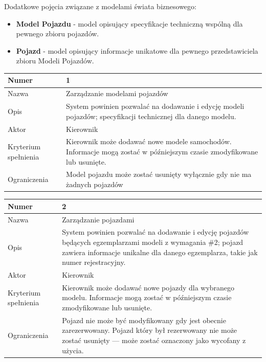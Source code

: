 \documentclass[eng,printmode,openany]{mgr}
\begin{document}
	Dodatkowe pojęcia związane z modelami świata biznesowego:
	\begin{itemize}
		\item \textbf{Model Pojazdu} - model opisujący specyfikacje techniczną wspólną dla pewnego zbioru pojazdów.
		\item \textbf{Pojazd} - model opisujący informacje unikatowe dla pewnego przedstawiciela zbioru Modeli Pojazdów.
	\end{itemize}
	
	\begin{table}[H]
		\begin{tabularx}{\textwidth}{|l|X|}
			\hline
			Numer                & 1  \\ \hline
			Nazwa                & Zarządzanie modelami pojazdów \\ \hline
			Opis                 & System powinien pozwalać na dodawanie i edycję modeli pojazdów; specyfikacji technicznej dla danego modelu.    \\ \hline
			Aktor                & Kierownik \\ \hline
			Kryterium spełnienia & Kierownik może dodawać nowe modele samochodów. Informacje mogą zostać w późniejszym czasie zmodyfikowane lub usunięte.\\ \hline
			Ograniczenia         & Model pojazdu może zostać usunięty wyłącznie gdy nie ma żadnych pojazdów \\ \hline
		\end{tabularx}
	\end{table}
	
	\begin{table}[H]
		\begin{tabularx}{\textwidth}{|l|X|}
			\hline
			Numer                & 2 \\ \hline
			Nazwa                & Zarządzanie pojazdami \\ \hline
			Opis                 & System powinien pozwalać na dodawanie i edycję pojazdów będących egzemplarzami modeli z wymagania \#2; pojazd zawiera informacje unikalne dla danego egzemplarza, takie jak numer rejestracyjny.     \\ \hline
			Aktor                & Kierownik \\ \hline
			Kryterium spełnienia & Kierownik może dodawać nowe pojazdy dla wybranego modelu. Informacje mogą zostać w późniejszym czasie zmodyfikowane lub usunięte.\\ \hline
			Ograniczenia         & Pojazd nie może być modyfikowany gdy jest obecnie zarezerwowany. Pojazd który był rezerwowany nie może zostać usunięty — może zostać oznaczony jako wycofany z użycia. \\ \hline
		\end{tabularx}
	\end{table}
	
\end{document}
